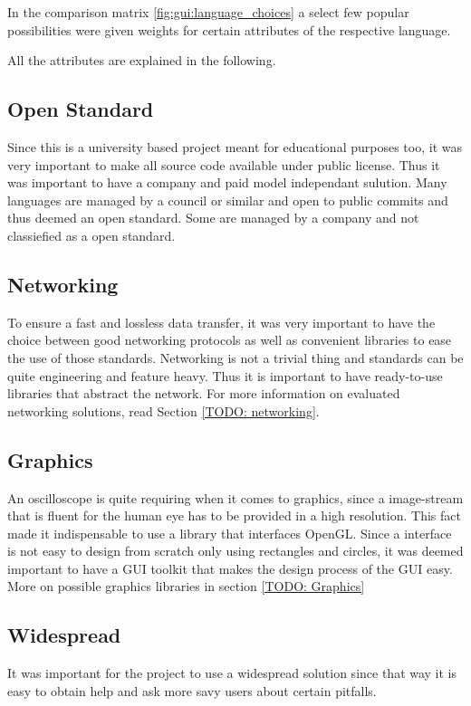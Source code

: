 In the comparison matrix \ref{fig:gui:language_choices} a select few popular possibilities were given weights for certain attributes of the respective language.

All the attributes are explained in the following.

\subsection*{Open Standard} Since this is a university based project meant for educational purposes too, it was very important to make all source code available under public license. Thus it was important to have a company and paid model independant sulution. Many languages are managed by a council or similar and open to public commits and thus deemed an open standard. Some are managed by a company and not classiefied as a open standard.

\subsection*{Networking} To ensure a fast and lossless data transfer, it was very important to have the choice between good networking protocols as well as convenient libraries to ease the use of those standards.
Networking is not a trivial thing and standards can be quite engineering and feature heavy. Thus it is important to have ready-to-use libraries that abstract the network. For more information on evaluated networking solutions, read Section \ref{TODO: networking}.

\subsection*{Graphics} An oscilloscope is quite requiring when it comes to graphics, since a image-stream that is fluent for the human eye has to be provided in a high resolution. This fact made it indispensable to use a library that interfaces OpenGL. Since a interface is not easy to design from scratch only using rectangles and circles, it was deemed important to have a GUI toolkit that makes the design process of the GUI easy. More on possible graphics libraries in section \ref{TODO: Graphics}

\subsection*{Widespread} It was important for the project to use a widespread solution since that way it is easy to obtain help and ask more savy users about certain pitfalls.

